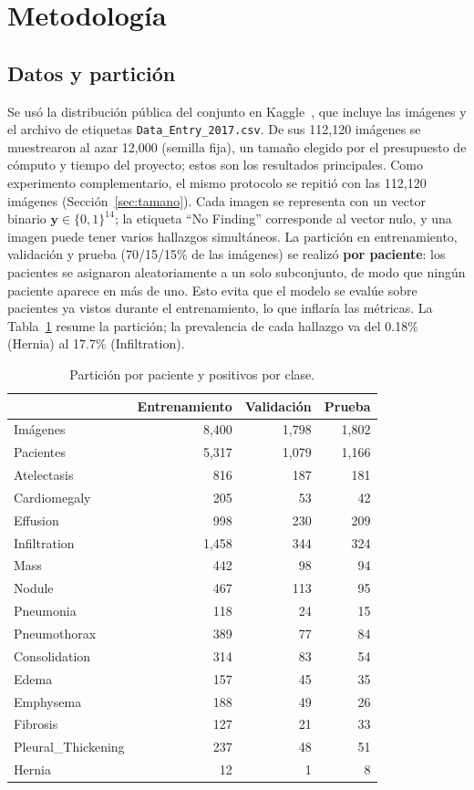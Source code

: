 \documentclass[conference]{IEEEtran}
\begin{document}
\section{Metodología}

\subsection{Datos y partición}
Se usó la distribución pública del conjunto en Kaggle~\cite{kaggle2018nih}, que incluye las imágenes y el archivo de etiquetas \texttt{Data\_Entry\_2017.csv}. De sus 112{,}120 imágenes se muestrearon al azar 12{,}000 (semilla fija), un tamaño elegido por el presupuesto de cómputo y tiempo del proyecto; estos son los resultados principales. Como experimento complementario, el mismo protocolo se repitió con las 112{,}120 imágenes (Sección~\ref{sec:tamano}). Cada imagen se representa con un vector binario $\mathbf{y}\in\{0,1\}^{14}$; la etiqueta ``No Finding'' corresponde al vector nulo, y una imagen puede tener varios hallazgos simultáneos. La partición en entrenamiento, validación y prueba (70/15/15\% de las imágenes) se realizó \textbf{por paciente}: los pacientes se asignaron aleatoriamente a un solo subconjunto, de modo que ningún paciente aparece en más de uno. Esto evita que el modelo se evalúe sobre pacientes ya vistos durante el entrenamiento, lo que inflaría las métricas. La Tabla~\ref{tab:datos} resume la partición; la prevalencia de cada hallazgo va del 0.18\% (Hernia) al 17.7\% (Infiltration).

\begin{table}[t]
\centering
\caption{Partición por paciente y positivos por clase.}
\label{tab:datos}
\begin{tabular}{lrrr}
\toprule
 & Entrenamiento & Validación & Prueba \\
\midrule
Imágenes & 8{,}400 & 1{,}798 & 1{,}802 \\
Pacientes & 5{,}317 & 1{,}079 & 1{,}166 \\
\midrule
Atelectasis & 816 & 187 & 181 \\
Cardiomegaly & 205 & 53 & 42 \\
Effusion & 998 & 230 & 209 \\
Infiltration & 1{,}458 & 344 & 324 \\
Mass & 442 & 98 & 94 \\
Nodule & 467 & 113 & 95 \\
Pneumonia & 118 & 24 & 15 \\
Pneumothorax & 389 & 77 & 84 \\
Consolidation & 314 & 83 & 54 \\
Edema & 157 & 45 & 35 \\
Emphysema & 188 & 49 & 26 \\
Fibrosis & 127 & 21 & 33 \\
Pleural\_Thickening & 237 & 48 & 51 \\
Hernia & 12 & 1 & 8 \\
\bottomrule
\end{tabular}
\end{table}
\end{document}
